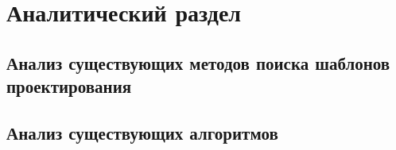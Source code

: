 \chapter{Аналитический раздел}
\label{cha:analysis}

\section{Анализ существующих методов поиска шаблонов проектирования}

\section{Анализ существующих алгоритмов }
